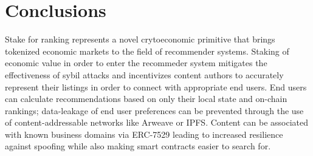 \section{Conclusions}

Stake for ranking represents a novel crytoeconomic primitive that brings tokenized economic markets to the field of recommender systems. Staking of economic value in order to enter the recommeder system mitigates the effectiveness of sybil attacks and incentivizes content authors to accurately represent their listings in order to connect with appropriate end users. End users can calculate recommendations based on only their local state and on-chain rankings; data-leakage of end user preferences can be prevented through the use of content-addressable networks like Arweave or IPFS. Content can be associated with known business domains via ERC-7529 leading to increased resilience against spoofing while also making smart contracts easier to search for.  